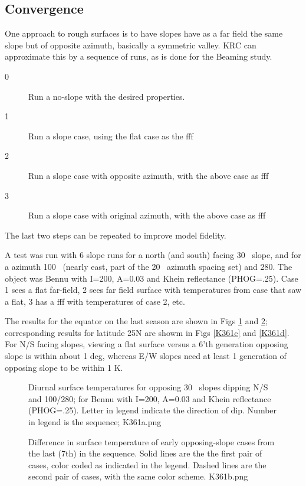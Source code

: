 \subsection{Convergence}

One approach to rough surfaces is to have slopes have as a far field the same slope but of opposite azimuth, basically a symmetric valley. KRC can approximate this by a sequence of runs, as is done for the Beaming study.

\begin{description}    %
 \item [0] Run a no-slope with the desired properties.
 \item [1] Run a slope case, using the flat case as the fff
 \item [2] Run a slope case with opposite azimuth, with the above case as fff
 \item [3] Run a slope case with original azimuth, with the above case as fff
\end{description}

The last two steps can be repeated to improve model fidelity.  

A test was run with 6 slope runs for a north (and south) facing 30\qd~ slope,
and for a azimuth 100\qd~ (nearly east, part of the 20\qd~ azimuth spacing set)
and 280\qd. The object was Bennu with I=200, A=0.03 and Khein reflectance
(PHOG=.25). Case 1 sees a flat far-field, 2 sees far field surface with temperatures from case that saw a flat, 3 has a fff with temperatures of case 2, etc.

The results for the equator on the last season are shown in Figs \ref{K361a}
and \ref{K361b}; corresponding results for latitude 25N are showm in
Figs \ref{K361c} and \ref{K361d}. For N/S facing slopes, viewing a flat surface versus a 6'th generation opposing slope is within about 1 deg, whereas E/W slopes need at least 1 generation of opposing slope to be within 1 K. 
 
\begin{figure}[!ht] 
\caption[Valley temperatures]{Diurnal surface temperatures for opposing 30\qd~ slopes dipping N/S and 100/280\qd; for Bennu with I=200, A=0.03 and Khein reflectance
(PHOG=.25). Letter in legend indicate the direction of dip. Number in legend is
the sequence;
\label{K361a}  K361a.png  }
\end{figure} 

\begin{figure}[!ht] 
\caption[Valley convergence]{Difference in surface temperature of early opposing-slope cases from the last (7th) in the sequence. Solid lines are the the first pair of cases, color coded as indicated in the legend. Dashed lines are the second pair of cases, with the same color scheme.
\label{K361b}  K361b.png }
\end{figure} 


